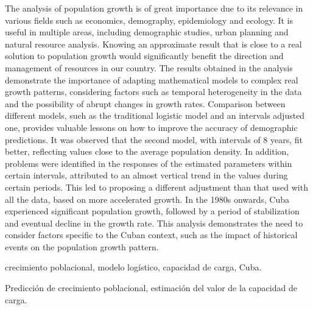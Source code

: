 \documentclass[a4paper,10pt,twocolumn]{article}
\begin{document}
\vspace{0.5cm}

\begin{enabstract}

	The analysis of population growth is of great importance due to its relevance in various fields such as economics, demography, epidemiology and ecology. It is useful in multiple areas, including demographic studies, urban planning and natural resource analysis. Knowing an approximate result that is close to a real solution to population growth would significantly benefit the direction and management of resources in our country. The results obtained in the analysis demonstrate the importance of adapting mathematical models to complex real growth patterns, considering factors such as temporal heterogeneity in the data and the possibility of abrupt changes in growth rates. Comparison between different models, such as the traditional logistic model and an intervals adjusted one, provides valuable lessons on how to improve the accuracy of demographic predictions. It was observed that the second model, with intervals of 8 years, fit better, reflecting values ​​close to the average population density. In addition, problems were identified in the responses of the estimated parameters within certain intervals, attributed to an almost vertical trend in the values ​​during certain periods. This led to proposing a different adjustment than that used with all the data, based on more accelerated growth. In the 1980s onwards, Cuba experienced significant population growth, followed by a period of stabilization and eventual decline in the growth rate. This analysis demonstrates the need to consider factors specific to the Cuban context, such as the impact of historical events on the population growth pattern.
\end{enabstract}

\begin{keywords}
	crecimiento poblacional, 
	modelo logístico, 
	capacidad de carga, 
	Cuba.
\end{keywords}

\begin{topics}
	Predicción de crecimiento poblacional, estimación del valor de la capacidad de carga.
\end{topics}
\end{document}

